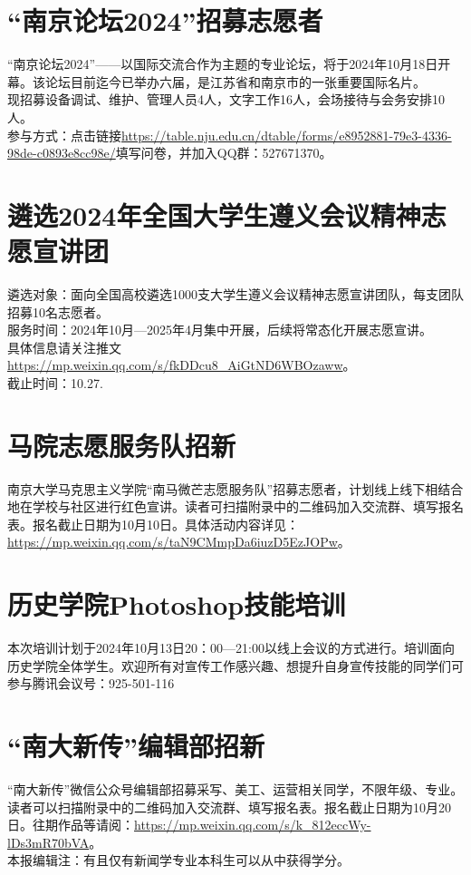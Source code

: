 \documentclass[letterpaper, 12pt]{article}
\begin{document}
\begin{multicols}{2}
\section{“南京论坛2024”招募志愿者}
“南京论坛2024”——以国际交流合作为主题的专业论坛，将于2024年10月18日开幕。该论坛目前迄今已举办六届，是江苏省和南京市的一张重要国际名片。\\
现招募设备调试、维护、管理人员4人，文字工作16人，会场接待与会务安排10人。\\
参与方式：点击链接\url{https://table.nju.edu.cn/dtable/forms/e8952881-79e3-4336-98de-c0893e8cc98e/}填写问卷，并加入QQ群：527671370。\\
\section{遴选2024年全国大学生遵义会议精神志愿宣讲团}
遴选对象：面向全国高校遴选1000支大学生遵义会议精神志愿宣讲团队，每支团队招募10名志愿者。\\
服务时间：2024年10月—2025年4月集中开展，后续将常态化开展志愿宣讲。\\
具体信息请关注推文\url{https://mp.weixin.qq.com/s/fkDDcu8_AiGtND6WBOzaww}。\\截止时间：10.27.
\section{马院志愿服务队招新}
南京大学马克思主义学院“南马微芒志愿服务队”招募志愿者，计划线上线下相结合地在学校与社区进行红色宣讲。读者可扫描附录中的二维码加入交流群、填写报名表。报名截止日期为10月10日。具体活动内容详见：\url{https://mp.weixin.qq.com/s/taN9CMmpDa6iuzD5EzJOPw}。
\section{历史学院Photoshop技能培训}
本次培训计划于2024年10月13日20：00—21:00以线上会议的方式进行。培训面向历史学院全体学生。欢迎所有对宣传工作感兴趣、想提升自身宣传技能的同学们可参与腾讯会议号：925-501-116
\section{“南大新传”编辑部招新}
“南大新传”微信公众号编辑部招募采写、美工、运营相关同学，不限年级、专业。读者可以扫描附录中的二维码加入交流群、填写报名表。报名截止日期为10月20日。往期作品等请阅：\url{https://mp.weixin.qq.com/s/k_812eccWy-lDs3mR70bVA}。\\
本报编辑注：有且仅有新闻学专业本科生可以从中获得学分。

\end{multicols}
\end{document}
